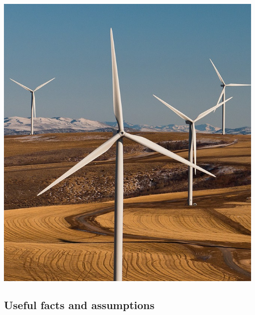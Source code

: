 \documentclass[11pt]{article}
\begin{document}
    \begin{minipage}[t][2.6in]{0.32\textwidth}
        \vspace{0pt}

       \includegraphics[width=\linewidth, keepaspectratio=.8]{windturbines.png}
    \end{minipage}

\subsection*{Useful facts and assumptions}
\vspace{-2.8ex}
\end{document}

